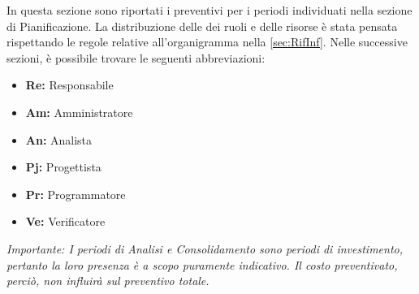 In questa sezione sono riportati i preventivi per i periodi individuati nella sezione di Pianificazione. \newline
La distribuzione delle dei ruoli e delle risorse è stata pensata rispettando le regole relative all'organigramma nella \autoref{sec:RifInf}.\newline
Nelle successive sezioni, è possibile trovare le seguenti abbreviazioni:
\begin{itemize}
	\item \textbf{Re: }Responsabile
	\item \textbf{Am: }Amministratore
	\item \textbf{An: }Analista
	\item \textbf{Pj: }Progettista
	\item \textbf{Pr: }Programmatore
	\item \textbf{Ve: }Verificatore	
\end{itemize}

\bigskip
\bigskip
\emph{Importante: I periodi di Analisi e Consolidamento sono periodi di investimento, pertanto la loro presenza è a scopo puramente indicativo. Il costo preventivato, perciò, non influirà sul preventivo totale.}\newline